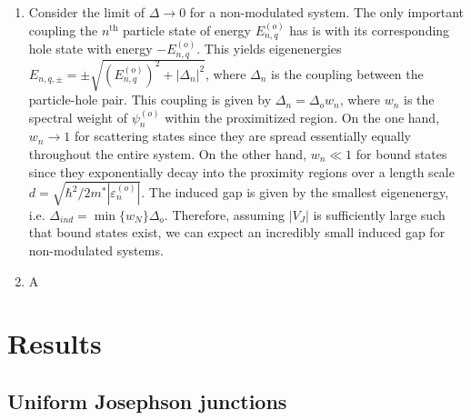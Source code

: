 \documentclass[twocolumn,aps,prb,nofootinbib]{revtex4-2}
\begin{document}
\begin{enumerate}
    \item Consider the limit of $\Delta \rightarrow 0$ for a non-modulated system. The only important coupling the $n^\text{th}$ particle state of energy $E_{n,q}^{(o)}$ has is with its corresponding hole state with energy $-E_{n,q}^{(o)}$. This yields eigenenergies $E_{n,q,\pm} = \pm \sqrt{(E_{n,q}^{(o)})^2 + |\Delta_n|^2}$, where $\Delta_n$ is the coupling between the particle-hole pair. This coupling is given by $\Delta_n = \Delta_o w_n$, where $w_n$ is the spectral weight of $ \psi_{n}^{(o)}$ within the proximitized region. On the one hand, $w_n \rightarrow 1$ for scattering states since they are spread essentially equally throughout the entire system. On the other hand, $w_n \ll 1$ for bound states since they exponentially decay into the proximity regions over a length scale $d = \sqrt{\hbar^2/2m^* |\varepsilon_n^{(o)}|}$. The induced gap is given by the smallest eigenenergy, i.e. $\Delta_{ind} =  \min\{w_N\} \Delta_o$. Therefore, assuming $|V_J|$ is sufficiently large such that bound states exist, we can expect an incredibly small induced gap for non-modulated systems.
    \item A
\end{enumerate}
\fi


\section{Results} \label{Results}

\subsection{Uniform Josephson junctions} \label{NoMod}
\end{document}
